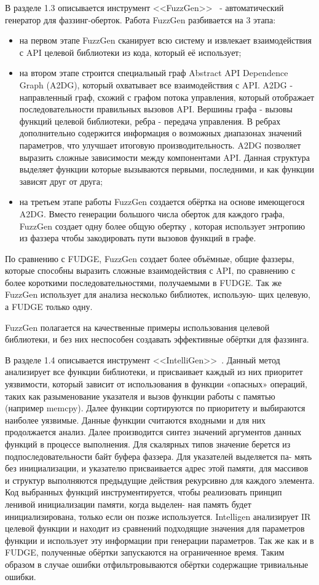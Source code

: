 В разделе 1.3 описывается инструмент <<FuzzGen>>~\autocite{251548} - автоматический генератор для фаззинг-оберток. Работа FuzzGen разбивается на 3 этапа:
\begin{itemize}
    \item на первом этапе FuzzGen сканирует всю систему и извлекает взаимодействия с API целевой библиотеки из кода, который её использует;
    \item на втором этапе строится специальный граф Abstract API Dependence Graph (A2DG), который охватывает все взаимодействия с API. A2DG - направленный граф, схожий с графом потока управления, который отображает последовательности правильных вызовов API. Вершины графа - вызовы функций целевой библиотеки, ребра - передача управления. В ребрах дополнительно содержится информация о возможных диапазонах значений параметров, что улучшает итоговую производительность. A2DG позволяет выразить сложные зависимости между компонентами API. Данная структура выделяет функции которые вызываются первыми, последними, и как функции зависят друг от друга;
    \item на третьем этапе работы FuzzGen создается обёртка на основе имеющегося A2DG. Вместо генерации большого числа оберток для каждого графа, FuzzGen создает одну более общую обертку , которая использует энтропию из фаззера чтобы закодировать пути вызовов функций в графе.
\end{itemize}  
По сравнению с FUDGE, FuzzGen создает более объёмные, общие фаззеры, которые способны выразить сложные взаимодействия с API, по сравнению с более короткими последовательностями, получаемыми в FUDGE. Так же FuzzGen использует для анализа несколько библиотек, использую- щих целевую, а FUDGE только одну.

FuzzGen полагается на качественные примеры использования целевой библиотеки, и без них неспособен создавать эффективные обёртки для фаззинга.

В разделе 1.4 описывается инструмент <<IntelliGen>>~\autocite{9402152}. Данный метод анализирует все функции библиотеки, и присваивает каждый из них приоритет уязвимости, который зависит от использования в функции «опасных» операций, таких как разыменование указателя и вызов функции работы с памятью (например memcpy). Далее функции сортируются по приоритету и выбираются наиболее уязвимые. Данные функции считаются входными и для них продолжается анализ. Далее производится синтез значений аргументов данных функций в процессе выполнения. Для скалярных типов значение берется из подпоследовательности байт буфера фаззера. Для указателей выделяется па- мять без инициализации, и указателю присваивается адрес этой памяти, для массивов и структур выполняются предыдущие действия рекурсивно для каждого элемента. Код выбранных функций инструментируется, чтобы реализовать принцип ленивой инициализации памяти, когда выделен- ная память будет инициализирована, только если он позже используется. Intelligen анализирует IR целевой функции и находит из сравнений подходящие значения для параметров функции и использует эту информации при генерации параметров. Так же как и в FUDGE, полученные обёртки запускаются на ограниченное время. Таким образом в случае ошибки отфильтровываются обёртки содержащие тривиальные ошибки.

